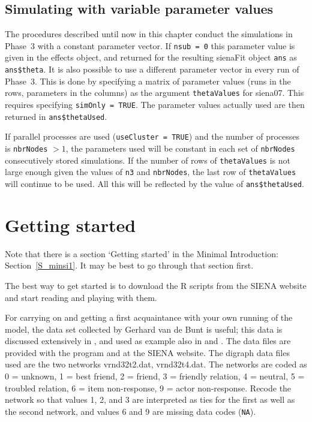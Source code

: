 \documentclass[a4paper,fleqn,11pt]{article}
\newcommand{\+}{\, + \,}
\newcommand{\R}{{\sf R }}
\newcommand{\SI}{{\sf SIENA }}
\begin{document}
\subsection{Simulating with variable parameter values}

The procedures described until now in this chapter conduct the simulations
in Phase~3 with a constant parameter vector.
If \texttt{nsub = 0} this parameter value is given in the effects object,
and returned for the resulting \textsf{sienaFit} object \texttt{ans}
as \texttt{ans\$theta}.
It is also possible to use a different parameter vector in every
run of Phase~3. This is done by specifying a matrix of parameter
values (runs in the rows, parameters in the columns) as the
argument \texttt{thetaValues} for \textsf{siena07}.
This requires specifying \texttt{simOnly = TRUE}.
The parameter values actually used are then returned
in \texttt{ans\$thetaUsed}.

If parallel processes are used (\texttt{useCluster = TRUE})
and the number of processes is \texttt{nbrNodes} $ > 1$,
the parameters used will be constant in each set of \texttt{nbrNodes}
consecutively stored simulations.
If the number of rows of \texttt{thetaValues} is not large enough
given the values of \texttt{n3} and \texttt{nbrNodes},
the last row of \texttt{thetaValues} will continue to be used.
All this will be reflected by the value of \texttt{ans\$thetaUsed}.


\newpage
\section{Getting started}
\label{S_getting}

Note that there is a section `Getting started' in the Minimal
Introduction: Section~\ref{S_minsi1}. It may be best
to go through that section first.

The best way to get started is to download the \R scripts from the
\SI website and start reading and playing with them.

For carrying on and getting a first acquaintance with your own running
of the model, the data set collected by Gerhard van de Bunt
is useful; this data is discussed extensively in
\citet*{vanBunt99, vanBuntEA99},
and used as example also in \citet{Snijders01} and \citet{Snijders05}.
The data files are provided with the program
and at the \SI website. The digraph data files
used are the two networks {\sf vrnd32t2.dat}, {\sf vrnd32t4.dat}.
The networks are coded as 0 = unknown, 1 = best friend, 2 = friend,
3 = friendly relation, 4 = neutral, 5 = troubled relation, 6 = item
non-response, 9 = actor non-response.
Recode the network so that values 1, 2, and 3 are interpreted
as ties for the first as well as the second network, and values 6 and 9
are missing data codes (\texttt{NA}).
\end{document}
